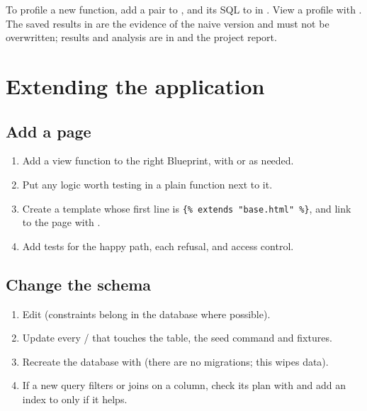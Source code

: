 \documentclass[11pt,a4paper]{article}
\begin{document}
To profile a new function, add a  pair to , and its SQL to
 in . View a profile with .
The saved results in  are the evidence of the naive version and must not be
overwritten; results and analysis are in  and the project report.

\section{Extending the application}

\subsection{Add a page}
\begin{enumerate}
  \item Add a view function to the right Blueprint, with  or
         as needed.
  \item Put any logic worth testing in a plain function next to it.
  \item Create a template whose first line is \verb|{% extends "base.html" %}|, and link
        to the page with .
  \item Add tests for the happy path, each refusal, and access control.
\end{enumerate}

\subsection{Change the schema}
\begin{enumerate}
  \item Edit  (constraints belong in the database where possible).
  \item Update every / that touches the table, the seed command and fixtures.
  \item Recreate the database with  (there are no migrations; this wipes data).
  \item If a new query filters or joins on a column, check its plan with  and
        add an index to  only if it helps.
\end{enumerate}
\end{document}
